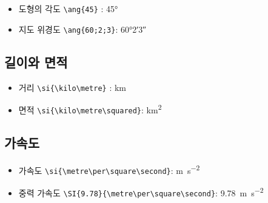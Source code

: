 \begin{itemize}
	\item 도형의 각도 \verb*|\ang{45}| : \ang{45}	
	\item 지도 위경도 \verb*|\ang{60;2;3}|: \ang{60;2;3}
\end{itemize}


\subsection{길이와 면적}

\begin{itemize}
	\item 거리 \verb*|\si{\kilo\metre}| : \si{\kilo\metre}	
	\item 면적 \verb*|\si{\kilo\metre\squared}|: \si{\kilo\metre\squared}
\end{itemize}

\subsection{가속도}

\begin{itemize}
	\item 가속도 \verb*|\si{\metre\per\square\second}|: \si{\metre\per\square\second}	
	\item 중력 가속도 \verb*|\SI{9.78}{\metre\per\square\second}|: \SI{9.78}{\metre\per\square\second}
\end{itemize}
